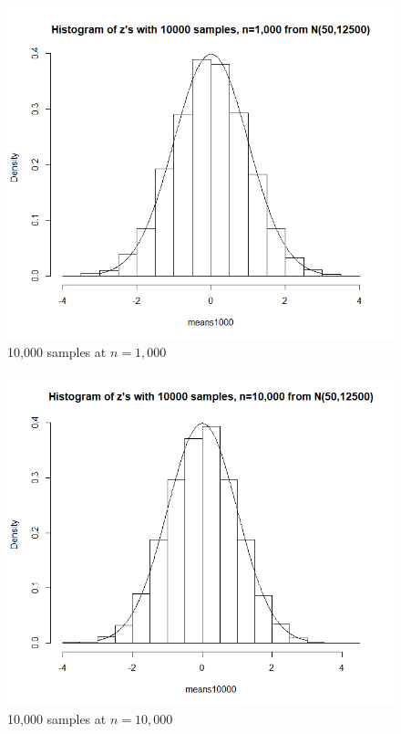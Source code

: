 \documentclass[12pt]{article}
\begin{document}
\begin{figure}[H]
	\centering
	\includegraphics{img/Problem6_3.png}
	\caption{10,000 samples at $n=1,000$}
\end{figure}

\begin{figure}[H]
	\centering
	\includegraphics{img/Problem6_4.png}
	\caption{10,000 samples at $n=10,000$}
\end{figure}
\end{document}
